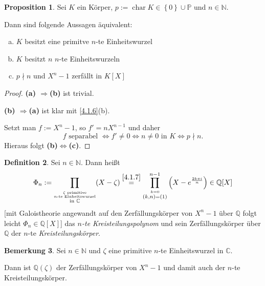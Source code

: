 \documentclass[
twoside=semi,
fontsize=12,
DIV=12, 
cleardoublepage=current,
leqno,
headings=optiontoheadandtoc, 
toc=idx
]{scrbook}
\newcommand{\N}{\mathbb{N}}
\newcommand{\Q}{\mathbb{Q}}
\newcommand{\C}{\mathbb{C}}
\renewcommand{\P}{\mathbb{P}}
\newcommand{\brac}[1]{\left( #1 \right)}
\newcommand{\set}[1]{\left\{ #1 \right\}}
\DeclareMathOperator{\Char}{char}
\theoremstyle{definition}
\newtheorem{definition}{Definition}[section]
\newtheorem{bemerkung}[definition]{Bemerkung}
\newtheorem{proposition}[definition]{Proposition}
\begin{document}
 	\begin{proposition}\label{4.1.8}\hfill\newline
 		Sei $K$ ein K\"orper, $p := \Char K \in \set{0} \cup \P$ und $n \in \N$. 
 		
 		\medskip\noindent 
 		Dann sind folgende Aussagen \"aquivalent:
 		\begin{enumerate}[(a)]
 			\item $K$ besitzt eine primitve $n$-te Einheitswurzel
 			\item $K$ besitzt $n$ $n$-te Einheitswurzeln
 			\item $p \nmid n$ und $X^n-1$ zerf\"allt in $K[X]$
 		\end{enumerate}
 		
 		\begin{proof}\hfill\newline
 			\textbf{(a) $\Longrightarrow$(b)} ist trivial.
 			
 			\medskip\noindent
 			\textbf{(b) $\Longrightarrow$(a)} ist klar mit \ref{4.1.6}(b).
 			
 			\medskip\noindent
 			Setzt man $f:= X^n - 1$, so $f' = nX^{n-1}$ und daher 
 				\[f \textrm{ separabel } \Longleftrightarrow f' \neq 0 \Longleftrightarrow n \neq 0 \textrm{ in } K \Longleftrightarrow p\nmid n.\]
 			Hieraus folgt \textbf{(b)$\Longleftrightarrow$(c)}.
 		\end{proof}
 	\end{proposition}
 
 	\begin{definition}\label{4.1.9}\hfill\newline
 		Sei $n \in \N$. Dann hei\ss t
 			\[\Phi_n := \prod_{\overset{\overset{\zeta \textrm{ primitive}}{n\textrm{-te Einheitswurzel}}}{\textrm{in } \C}}(X-\zeta) \overset{\ref{4.1.7}}{=} \prod_{\overset{k=0}{(k,n)=(1)}}^{n-1} \brac{X- e^{\frac{2k\pi i}{n}}} \in \Q[X]\]
 		[mit Galoistheorie angewandt auf den Zerf\"allungsk\"orper von $X^n-1$ \"uber $\Q$ folgt leicht $\Phi_n \in \Q[X]$] das \emph{$n$-te Kreisteilungspolynom} und sein Zerf\"allungsk\"orper \"uber $\Q$ der $n$-te \emph{Kreisteilungsk\"orper}.
 	\end{definition}
 
 	\begin{bemerkung}\label{4.1.10}\hfill\newline
 		Sei $n \in \N$ und $\zeta$ eine primitive $n$-te Einheitswurzel in $\C$. 
 		
 		\medskip\noindent
 		Dann ist $\Q(\zeta)$ der Zerf\"allungsk\"orper von $X^n-1$ und damit auch der $n$-te Kreisteilungsk\"orper.
 	\end{bemerkung}
 
\end{document}
